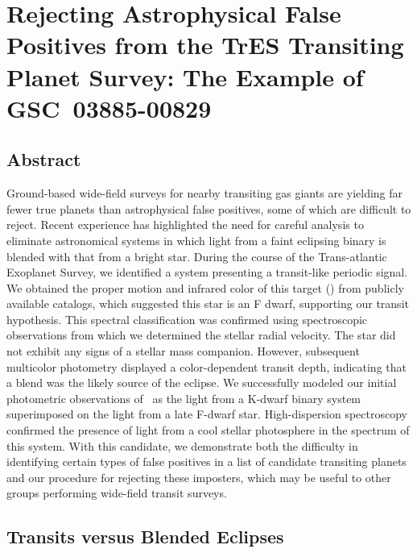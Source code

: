 \chapter[Rejecting Astrophysical False Positives from the TrES Transiting Planet Survey: The Example of \mbox{GSC 03885-00829}]{Rejecting Astrophysical False Positives from the TrES Transiting Planet Survey: The Example of \mbox{GSC 03885-00829}%
\protect\CFNA%
}\label{cha:gsc}

\section*{Abstract}\label{cha:gsc:sec:abs}

  Ground-based wide-field surveys for nearby transiting gas giants
  are yielding far fewer true planets than astrophysical false
  positives, some of which are difficult to reject. Recent experience
  has highlighted the need for careful analysis to eliminate
  astronomical systems in which light from a faint eclipsing binary is
  blended with that from a bright star. During the course of the
  Trans-atlantic Exoplanet Survey, we identified a system presenting
  a transit-like periodic signal. We obtained the proper motion and
  infrared color of this target (\gscOTE) from publicly available
  catalogs, which suggested this star is an F dwarf, supporting our
  transit hypothesis.  This spectral classification was confirmed
  using spectroscopic observations from which we determined the
  stellar radial velocity. The star did not exhibit any signs of a
  stellar mass companion. However, subsequent multicolor photometry
  displayed a color-dependent transit depth, indicating that a blend
  was the likely source of the eclipse. We successfully modeled our
  initial photometric observations of \gscOTE\ as the light from a K-dwarf binary system superimposed on the light from a late F-dwarf
  star. High-dispersion spectroscopy confirmed the presence of light
  from a cool stellar photosphere in the spectrum of this system. With
  this candidate, we demonstrate both the difficulty in identifying
  certain types of false positives in a list of candidate transiting
  planets and our procedure for rejecting these imposters, which may
  be useful to other groups performing wide-field transit surveys.

\section{Transits versus Blended Eclipses}\label{cha:gsc:sec:intro}

